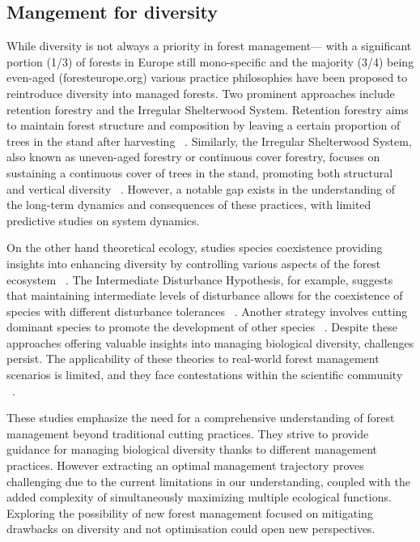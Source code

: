 \documentclass{article}
\begin{document}
\subsection{Mangement for diversity}

While diversity is not always a priority in forest management— with a significant portion (1/3) of forests in Europe still mono-specific and the majority (3/4) being even-aged (foresteurope.org) various practice philosophies have been proposed to reintroduce diversity into managed forests. Two prominent approaches include retention forestry and the Irregular Shelterwood System.
Retention forestry aims to maintain forest structure and composition by leaving a certain proportion of trees in the stand after harvesting ~\autocite{gustafssonRetentionForestryMaintain2012,rosenvaldWhatWhenWhere2008}. Similarly, the Irregular Shelterwood System, also known as uneven-aged forestry or continuous cover forestry, focuses on sustaining a continuous cover of trees in the stand, promoting both structural and vertical diversity ~\autocite{sinhaOptimalManagementNaturally2017,schallImpactEvenagedUnevenaged2018,nylandEvenUnevenagedChallenges2003,noletComparingEffectsEven2018,dudumanForestManagementPlanning2011}. However, a notable gap exists in the understanding of the long-term dynamics and consequences of these practices, with limited predictive studies on system dynamics.

On the other hand theoretical ecology, studies species coexistence providing insights into enhancing diversity by controlling various aspects of the forest ecosystem ~\autocite{wilsonTwelveTheoriesCoexistence2011}. The Intermediate Disturbance Hypothesis, for example, suggests that maintaining intermediate levels of disturbance allows for the coexistence of species with different disturbance tolerances ~\autocite{connellDiversityTropicalRain1978,sheilDefiningDefendingConnell2013}. Another strategy involves cutting dominant species to promote the development of other species ~\autocite{pichancourtGrowingBiodiverseCarbonrich2014}.
Despite these approaches offering valuable insights into managing biological diversity, challenges persist. The applicability of these theories to real-world forest management scenarios is limited, and they face contestations within the scientific community ~\autocite{mackeyReexaminationExpectedEffects2000,foxIntermediateDisturbanceHypothesis2013}.

These studies emphasize the need for a comprehensive understanding of forest management beyond traditional cutting practices. They strive to provide guidance for managing biological diversity thanks to different management practices. However extracting an optimal management trajectory proves challenging due to the current limitations in our understanding, coupled with the added complexity of simultaneously maximizing multiple ecological functions. Exploring the possibility of new forest management focused on mitigating drawbacks on diversity and not optimisation could open new perspectives.\\
\end{document}
